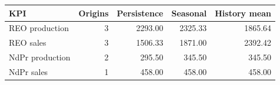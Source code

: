 \begin{tabular}{lrrrr}\toprule
KPI & Origins & Persistence & Seasonal & History mean \\\midrule
REO production & 3 & 2293.00 & 2325.33 & 1865.64 \\
REO sales & 3 & 1506.33 & 1871.00 & 2392.42 \\
NdPr production & 2 & 295.50 & 345.50 & 345.50 \\
NdPr sales & 1 & 458.00 & 458.00 & 458.00 \\
\bottomrule\end{tabular}
